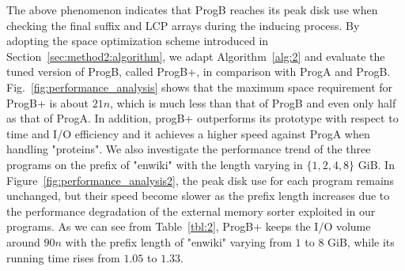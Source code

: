 \documentclass[10pt,journal,compsoc]{IEEEtran}
\begin{document}
The above phenomenon indicates that ProgB reaches its peak disk use when checking the final suffix and LCP arrays during the inducing process. By adopting the space optimization scheme introduced in Section~\ref{sec:method2:algorithm}, we adapt Algorithm~\ref{alg:2} and evaluate the tuned version of ProgB, called ProgB+, in comparison with ProgA and ProgB. Fig.~\ref{fig:performance_analysis} shows that the maximum space requirement for ProgB+ is about $21n$, which is much less than that of ProgB and even only half as that of ProgA. In addition, progB+ outperforms its prototype with respect to time and I/O efficiency and it achieves a higher speed against ProgA when handling "proteins". We also investigate the performance trend of the three programs on the prefix of "enwiki" with the length varying in $\{1, 2, 4, 8\}$ GiB. In Figure~\ref{fig:performance_analysis2}, the peak disk use for each program remains unchanged, but their speed become slower as the prefix length increases due to the performance degradation of the external memory sorter exploited in our programs. As we can see from Table~\ref{tbl:2}, ProgB+ keeps the I/O volume around $90n$ with the prefix length of "enwiki" varying from $1$ to $8$ GiB, while its running time rises from $1.05$ to $1.33$.
\end{document}
